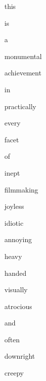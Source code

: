\documentclass[varwidth]{standalone}
\begin{document}
\begin{CJK*}{UTF8}{gbsn}
{\setlength{\fboxsep}{0pt}\colorbox{white!0}{\parbox{0.8\textwidth}{
\colorbox{red!8.909469}{\strut this} \colorbox{red!33.77937}{\strut is} \colorbox{red!18.624908}{\strut a} \colorbox{red!55.578136}{\strut monumental} \colorbox{red!41.262417}{\strut achievement} \colorbox{red!5.3731484}{\strut in} \colorbox{blue!4.1069193}{\strut practically} \colorbox{red!4.6076636}{\strut every} \colorbox{red!1.3940359}{\strut facet} \colorbox{red!1.8146495}{\strut of} \colorbox{blue!45.811497}{\strut inept} \colorbox{red!9.2413}{\strut filmmaking} \colorbox{red!4.2215915}{\strut joyless} \colorbox{blue!16.374537}{\strut idiotic} \colorbox{blue!9.571635}{\strut annoying} \colorbox{blue!1.9741886}{\strut heavy} \colorbox{red!0.637793}{\strut handed} \colorbox{red!0.52921695}{\strut visually} \colorbox{red!5.2619357}{\strut atrocious} \colorbox{red!1.8014765}{\strut and} \colorbox{red!6.4284563}{\strut often} \colorbox{blue!6.3127823}{\strut downright} \colorbox{blue!12.012668}{\strut creepy} 
}}}
\end{CJK*}
\end{document}
